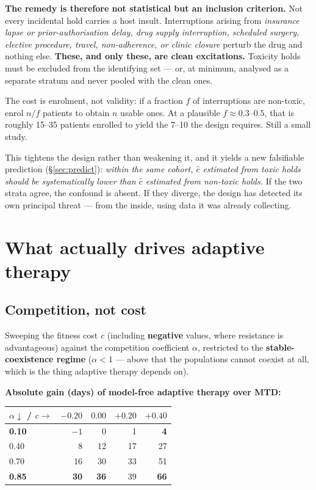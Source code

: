 \documentclass[11pt,a4paper]{article}
\begin{document}
\textbf{The remedy is therefore not statistical but an inclusion criterion.} Not every
incidental hold carries a host insult. Interruptions arising from
\emph{insurance lapse or prior-authorisation delay, drug supply interruption,
scheduled surgery, elective procedure, travel, non-adherence, or clinic closure}
perturb the drug and nothing else. \textbf{These, and only these, are clean
excitations.} Toxicity holds must be excluded from the identifying set --- or, at
minimum, analysed as a separate stratum and never pooled with the clean ones.

The cost is enrolment, not validity: if a fraction $f$ of interruptions are non-toxic,
enrol $n/f$ patients to obtain $n$ usable ones. At a plausible $f \approx 0.3$--$0.5$,
that is roughly 15--35 patients enrolled to yield the 7--10 the design requires. Still
a small study.

This tightens the design rather than weakening it, and it yields a new falsifiable
prediction (\S\ref{sec:predict}): \emph{within the same cohort, $\hat{c}$ estimated from toxic
holds should be systematically lower than $\hat{c}$ estimated from non-toxic holds.}
If the two strata agree, the confound is absent. If they diverge, the design has
detected its own principal threat --- from the inside, using data it was already
collecting.


\section{What actually drives adaptive therapy}

\subsection{Competition, not cost}

Sweeping the fitness cost $c$ (including \textbf{negative} values, where resistance
is advantageous) against the competition coefficient $\alpha$, restricted to the
\textbf{stable-coexistence regime} ($\alpha < 1$ --- above that the populations
cannot coexist at all, which is the thing adaptive therapy depends on).

\textbf{Absolute gain (days) of model-free adaptive therapy over MTD:}

\begin{center}
\begin{tabular}{lrrrr}
\toprule
$\alpha \downarrow$ \textbf{/} $c \rightarrow$ & $-0.20$ & $0.00$ & $+0.20$ & $+0.40$\\
\midrule
\textbf{0.10} & $-1$ & 0 & 1 & \textbf{4}\\
0.40 & 8 & 12 & 17 & 27\\
0.70 & 16 & 30 & 33 & 51\\
\textbf{0.85} & \textbf{30} & \textbf{36} & 39 & \textbf{66}\\
\bottomrule
\end{tabular}
\end{center}
\end{document}
